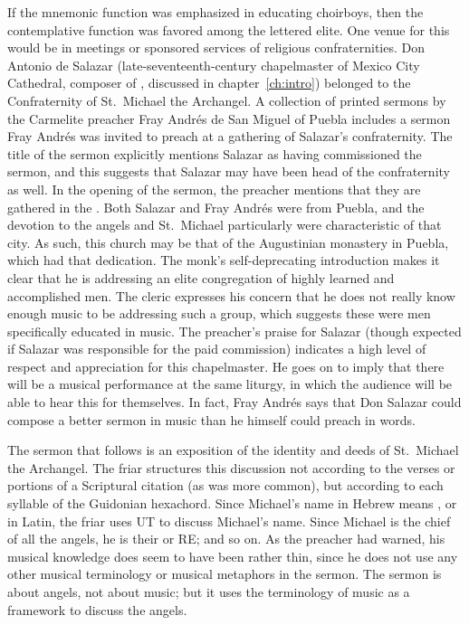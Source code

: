 If the mnemonic function was emphasized in educating choirboys, then the contemplative function was favored among the lettered elite.
One venue for this would be in meetings or sponsored services of religious confraternities.
Don Antonio de Salazar (late-seventeenth-century chapelmaster of Mexico City Cathedral, composer of , discussed in chapter~\ref{ch:intro}) belonged to the Confraternity of St.~Michael the Archangel.
A collection of printed sermons by the Carmelite preacher Fray Andrés de San Miguel of Puebla includes a sermon Fray Andrés was invited to preach at a gathering of Salazar's confraternity.
The title of the sermon explicitly mentions Salazar as having commissioned the sermon, and this suggests that Salazar may have been head of the confraternity as well. 
In the opening of the sermon, the preacher mentions that they are gathered in the .
Both Salazar and Fray Andrés were from Puebla, and the devotion to the angels and St.~Michael particularly were characteristic of that city. 
As such, this church may be that of the Augustinian monastery in Puebla, which had that dedication. 
The monk's self-deprecating introduction makes it clear that he is addressing an elite congregation of highly learned and accomplished men.
The cleric expresses his concern that he does not really know enough music to be addressing such a group, which suggests these were men specifically educated in music.
The preacher's praise for Salazar (though expected if Salazar was responsible for the paid commission) indicates a high level of respect and appreciation for this chapelmaster.
He goes on to imply that there will be a musical performance at the same liturgy, in which the audience will be able to hear this for themselves.
In fact, Fray Andrés says that Don Salazar could compose a better sermon in music than he himself could preach in words. 

The sermon that follows is an exposition of the identity and deeds of St.~Michael the Archangel.
The friar structures this discussion not according to the verses or portions of a Scriptural citation (as was more common), but according to each syllable of the Guidonian hexachord.
Since Michael's name in Hebrew means , or  in Latin, the friar uses UT to discuss Michael's name.
Since Michael is the chief of all the angels, he is their  or RE; and so on.
As the preacher had warned, his musical knowledge does seem to have been rather thin, since he does not use any other musical terminology or musical metaphors in the sermon. 
The sermon is about angels, not about music; but it uses the terminology of music as a framework to discuss the angels.

